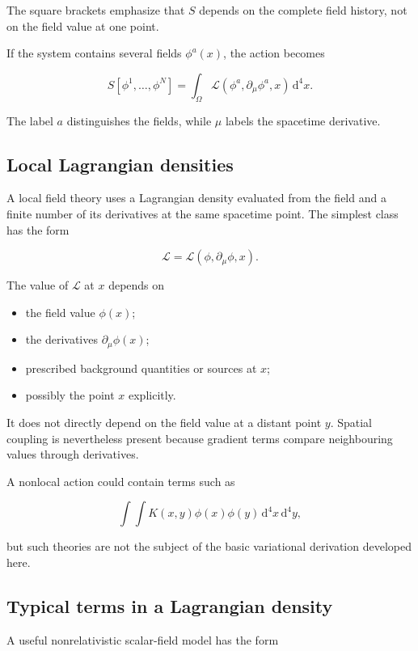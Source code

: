 The square brackets emphasize that \(S\) depends on the complete field history, not on the field value at one point.

If the system contains several fields \(\phi^{a}(x)\), the action becomes

\[
S[\phi^{1},\ldots,\phi^{N}]
=
\int_{\Omega}
\mathcal{L}(\phi^{a},\partial_{\mu}\phi^{a},x)
\,\mathrm{d}^{4}x.
\]

The label \(a\) distinguishes the fields, while \(\mu\) labels the spacetime derivative.

\subsection{Local Lagrangian densities}

A local field theory uses a Lagrangian density evaluated from the field and a finite number of its derivatives at the same spacetime point. The simplest class has the form

\[
\mathcal{L}
=
\mathcal{L}(\phi,\partial_{\mu}\phi,x).
\]

The value of \(\mathcal{L}\) at \(x\) depends on

\begin{itemize}
    \item the field value \(\phi(x)\);
    \item the derivatives \(\partial_{\mu}\phi(x)\);
    \item prescribed background quantities or sources at \(x\);
    \item possibly the point \(x\) explicitly.
\end{itemize}

It does not directly depend on the field value at a distant point \(y\). Spatial coupling is nevertheless present because gradient terms compare neighbouring values through derivatives.

A nonlocal action could contain terms such as

\[
\int\!\int
K(x,y)\phi(x)\phi(y)
\,\mathrm{d}^{4}x\,\mathrm{d}^{4}y,
\]

but such theories are not the subject of the basic variational derivation developed here.

\subsection{Typical terms in a Lagrangian density}

A useful nonrelativistic scalar-field model has the form

